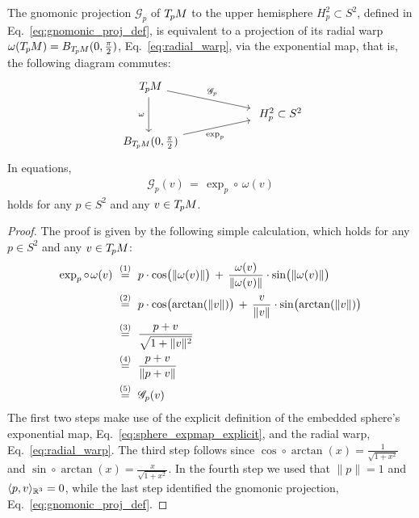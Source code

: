 \begin{thm}
\label{thm:gnomonic}
    The gnomonic projection $\mathscr{G}_p$ of $T_{\mkern-1.5mu p}\mkern-.5muM$ to the upper hemisphere $H_p^2\subset S^2$, defined in Eq.~\eqref{eq:gnomonic_proj_def}, is equivalent to a projection of its radial warp $\omega(T_{\mkern-1.5mu p}\mkern-.5muM) = B_{T_{\mkern-1.5mu p}\mkern-.5muM}(0,{\textstyle\frac{\pi}{2}})$, Eq.~\eqref{eq:radial_warp}, via the exponential map, that is, the following diagram commutes:
    \begin{equation}\label{cd:gnomonic_exp_warp}
    \begin{tikzcd}[column sep=60, row sep=6pt, font=\normalsize]
        \TpM
            \arrow[dr, pos=.45, "\mathscr{G}_p"]
            \arrow[dd, "\omega\,"']
        \\
        & H_p^2 \subset S^2
        \\
        B_{\TpM}(0,{\textstyle\frac{\pi}{2}})
            \arrow[ur, pos=.3, "\exp_p"']
    \end{tikzcd}
    \end{equation}
    In equations,
    \begin{align}
        \mathscr{G}_p(v) \,=\, \exp_p \circ\, \omega(v)
    \end{align}
    holds for any $p\in S^2$ and any $v\in T_{\mkern-1.5mu p}\mkern-.5muM$.
\end{thm}
\begin{proof}
    The proof is given by the following simple calculation, which holds for any $p\in S^2$ and any $v\in T_{\mkern-1.5mu p}\mkern-.5muM$:
    \begin{align}
        \exp_p \circ\mkern2mu \omega (v)
        \ &\overset{(1)}{=}\ p\cdot \cos\! \big(\lVert \omega(v)\rVert\big) \,+\, \frac{\omega(v)}{\lVert \omega(v)\rVert}\cdot \sin\! \big(\lVert \omega(v)\rVert\big) \notag \\
        \ &\overset{(2)}{=}\ p\cdot \cos\! \big(\!\arctan(\lVert v\rVert)\big) \,+\, \frac{v}{\lVert v\rVert}\cdot \sin\! \big(\!\arctan(\lVert v\rVert)\big) \notag \\
        \ &\overset{(3)}{=}\ \frac{p+v}{\sqrt{1+\lVert v\rVert^2}} \notag \\
        \ &\overset{(4)}{=}\ \frac{p+v}{\lVert p+v\rVert} \notag \\
        \ &\overset{(5)}{=}\ \mathscr{G}_p(v)
    \end{align}
    The first two steps make use of the explicit definition of the embedded sphere's exponential map, Eq.~\eqref{eq:sphere_expmap_explicit}, and the radial warp, Eq.~\eqref{eq:radial_warp}.
    The third step follows since $\cos \circ \arctan(x) = \frac{1}{\sqrt{1+x^2}}$ and $\sin \circ \arctan(x) = \frac{x}{\sqrt{1+x^2}}$.
    In the fourth step we used that $\lVert p\rVert = 1$ and $\langle p,v\rangle_{\mathbb{R}^3} = 0$, while the last step identified the gnomonic projection, Eq.~\eqref{eq:gnomonic_proj_def}.
\end{proof}
